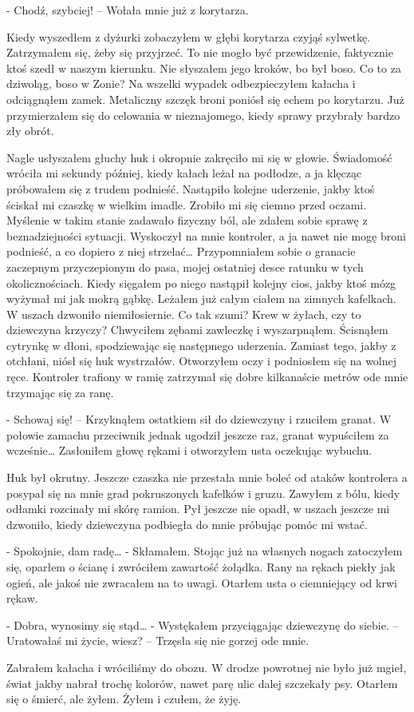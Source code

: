 \documentclass[../MAIN.tex]{subfiles}
\begin{document}
- Chodź, szybciej! – Wołała mnie już z korytarza.

Kiedy wyszedłem z dyżurki zobaczyłem w głębi korytarza czyjąś sylwetkę. Zatrzymałem się, żeby się przyjrzeć. To nie mogło być przewidzenie, faktycznie ktoś szedł w naszym kierunku. Nie słyszałem jego kroków, bo był boso. Co to za dziwoląg, boso w Zonie? Na wszelki wypadek odbezpieczyłem kałacha i odciągnąłem zamek. Metaliczny szczęk broni poniósł się echem po korytarzu. Już przymierzałem się do celowania w nieznajomego, kiedy sprawy przybrały bardzo zły obrót.

Nagle usłyszałem głuchy huk i okropnie zakręciło mi się w głowie. Świadomość wróciła mi sekundy później, kiedy kałach leżał na podłodze, a ja klęcząc próbowałem się z trudem podnieść. Nastąpiło kolejne uderzenie, jakby ktoś ściskał mi czaszkę w wielkim imadle. Zrobiło mi się ciemno przed oczami. Myślenie w takim stanie zadawało fizyczny ból, ale zdałem sobie sprawę z beznadziejności sytuacji. Wyskoczył na mnie kontroler, a ja nawet nie mogę broni podnieść, a co dopiero z niej strzelać… Przypomniałem sobie o granacie zaczepnym przyczepionym do pasa, mojej ostatniej desce ratunku w tych okolicznościach. Kiedy sięgałem po niego nastąpił kolejny cios, jakby ktoś mózg wyżymał mi jak mokrą gąbkę. Leżałem już całym ciałem na zimnych kafelkach. W uszach dzwoniło niemiłosiernie. Co tak szumi? Krew w żyłach, czy to dziewczyna krzyczy? Chwyciłem zębami zawleczkę i wyszarpnąłem. Ścisnąłem cytrynkę w dłoni, spodziewając się następnego uderzenia. Zamiast tego, jakby z otchłani, niósł się huk wystrzałów. Otworzyłem oczy i podniosłem się na wolnej ręce. Kontroler trafiony w ramię zatrzymał się dobre kilkanaście metrów ode mnie trzymając się za ranę.

- Schowaj się! – Krzyknąłem ostatkiem sił do dziewczyny i rzuciłem granat. W połowie zamachu przeciwnik jednak ugodził jeszcze raz, granat wypuściłem za wcześnie… Zasłoniłem głowę rękami i otworzyłem usta oczekując wybuchu.

Huk był okrutny. Jeszcze czaszka nie przestała mnie boleć od ataków kontrolera a posypał się na mnie grad pokruszonych kafelków i gruzu. Zawyłem z bólu, kiedy odłamki rozcinały mi skórę ramion. Pył jeszcze nie opadł, w uszach jeszcze mi dzwoniło, kiedy dziewczyna podbiegła do mnie próbując pomóc mi wstać.

- Spokojnie, dam radę… - Skłamałem. Stojąc już na własnych nogach zatoczyłem się, oparłem o ścianę i zwróciłem zawartość żołądka. Rany na rękach piekły jak ogień, ale jakoś nie zwracałem na to uwagi. Otarłem usta o ciemniejący od krwi rękaw.

- Dobra, wynosimy się stąd… - Wystękałem przyciągając dziewczynę do siebie. – Uratowałaś mi życie, wiesz? – Trzęsła się nie gorzej ode mnie.

Zabrałem kałacha i wróciliśmy do obozu. W drodze powrotnej nie było już mgieł, świat jakby nabrał trochę kolorów, nawet parę ulic dalej szczekały psy. Otarłem się o śmierć, ale żyłem. Żyłem i czułem, że żyję.
\end{document}
